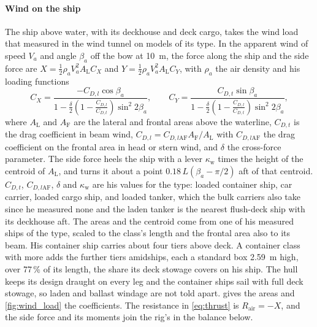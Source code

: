 \paragraph{Wind on the ship} The ship above water, with its deckhouse and deck cargo, takes the wind load that \citet{blendermann1993} measured in the wind tunnel on models of its type. In the apparent wind of speed $V_a$ and angle $\beta_a$ off the bow at \SI{10}{m}, the force along the ship and the side force are $X = \tfrac12\rho_a V_a^2 A_\mathrm{L} C_X$ and $Y = \tfrac12\rho_a V_a^2 A_\mathrm{L} C_Y$, with $\rho_a$ the air density and his loading functions
\begin{equation}
C_X = \frac{-C_{D,l}\cos\beta_a}{1-\tfrac{\delta}{2}\left(1-\tfrac{C_{D,l}}{C_{D,t}}\right)\sin^2 2\beta_a}, \qquad
C_Y = \frac{C_{D,t}\sin\beta_a}{1-\tfrac{\delta}{2}\left(1-\tfrac{C_{D,l}}{C_{D,t}}\right)\sin^2 2\beta_a},
\end{equation}
where $A_\mathrm{L}$ and $A_\mathrm{F}$ are the lateral and frontal areas above the waterline, $C_{D,t}$ is the drag coefficient in beam wind, $C_{D,l}=C_{D,l\mathrm{AF}}A_\mathrm{F}/A_\mathrm{L}$ with $C_{D,l\mathrm{AF}}$ the drag coefficient on the frontal area in head or stern wind, and $\delta$ the cross-force parameter. The side force heels the ship with a lever $\kappa_\mathrm{w}$ times the height of the centroid of $A_\mathrm{L}$, and turns it about a point $0.18\,L(\beta_a-\pi/2)$ aft of that centroid. $C_{D,t}$, $C_{D,l\mathrm{AF}}$, $\delta$ and $\kappa_\mathrm{w}$ are his values for the type: loaded container ship, car carrier, loaded cargo ship, and loaded tanker, which the bulk carriers also take since he measured none and the laden tanker is the nearest flush-deck ship with its deckhouse aft. The areas and the centroid come from one of his measured ships of the type, scaled to the class's length and the frontal area also to its beam. His container ship carries about four tiers above deck. A container class with more adds the further tiers amidships, each a standard box \SI{2.59}{m} high, over 77\,\% of its length, the share its deck stowage covers on his ship. The hull keeps its design draught on every leg and the container ships sail with full deck stowage, so laden and ballast windage are not told apart.  gives the areas and \cref{fig:wind_load} the coefficients. The resistance in \cref{eq:thrust} is $R_\mathrm{air}=-X$, and the side force and its moments join the rig's in the balance below.


